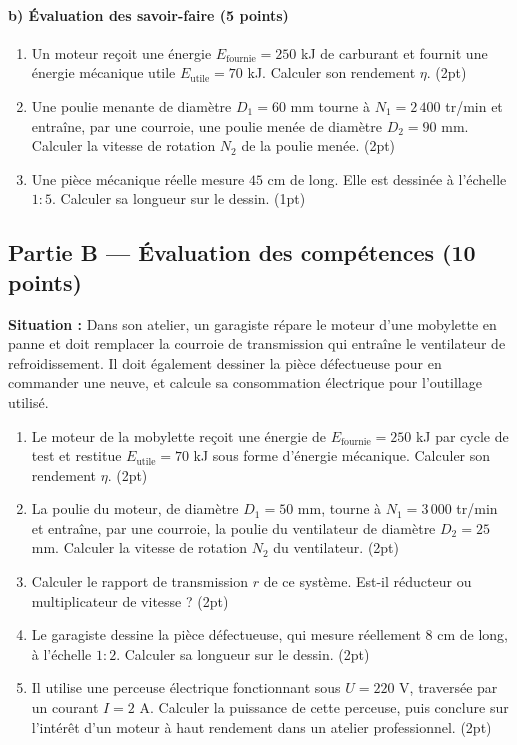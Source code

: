 \paragraph{b) Évaluation des savoir-faire (5 points)}
\begin{enumerate}[label=\arabic*)]
\item Un moteur reçoit une énergie $E_{\text{fournie}}=250$ kJ de carburant et fournit une
énergie mécanique utile $E_{\text{utile}}=70$ kJ. Calculer son rendement $\eta$.
\hfill (2pt)
\item Une poulie menante de diamètre $D_1=60$ mm tourne à $N_1=2\,400$ tr/min et entraîne,
par une courroie, une poulie menée de diamètre $D_2=90$ mm. Calculer la vitesse de
rotation $N_2$ de la poulie menée. \hfill (2pt)
\item Une pièce mécanique réelle mesure $45$ cm de long. Elle est dessinée à l'échelle
$1{:}5$. Calculer sa longueur sur le dessin. \hfill (1pt)
\end{enumerate}

\subsection*{Partie B — Évaluation des compétences (10 points)}

\noindent\textbf{Situation :} Dans son atelier, un garagiste répare le moteur d'une
mobylette en panne et doit remplacer la courroie de transmission qui entraîne le
ventilateur de refroidissement. Il doit également dessiner la pièce défectueuse pour en
commander une neuve, et calcule sa consommation électrique pour l'outillage utilisé.

\begin{enumerate}[label=\textbf{Tâche \arabic*.}, leftmargin=2.2cm]
\item Le moteur de la mobylette reçoit une énergie de $E_{\text{fournie}}=250$ kJ par
cycle de test et restitue $E_{\text{utile}}=70$ kJ sous forme d'énergie mécanique.
Calculer son rendement $\eta$. \hfill (2pt)
\item La poulie du moteur, de diamètre $D_1=50$ mm, tourne à $N_1=3\,000$ tr/min et
entraîne, par une courroie, la poulie du ventilateur de diamètre $D_2=25$ mm. Calculer la
vitesse de rotation $N_2$ du ventilateur. \hfill (2pt)
\item Calculer le rapport de transmission $r$ de ce système. Est-il réducteur ou
multiplicateur de vitesse ? \hfill (2pt)
\item Le garagiste dessine la pièce défectueuse, qui mesure réellement $8$ cm de long, à
l'échelle $1{:}2$. Calculer sa longueur sur le dessin. \hfill (2pt)
\item Il utilise une perceuse électrique fonctionnant sous $U=220$ V, traversée par un
courant $I=2$ A. Calculer la puissance de cette perceuse, puis conclure sur l'intérêt
d'un moteur à haut rendement dans un atelier professionnel. \hfill (2pt)
\end{enumerate}

